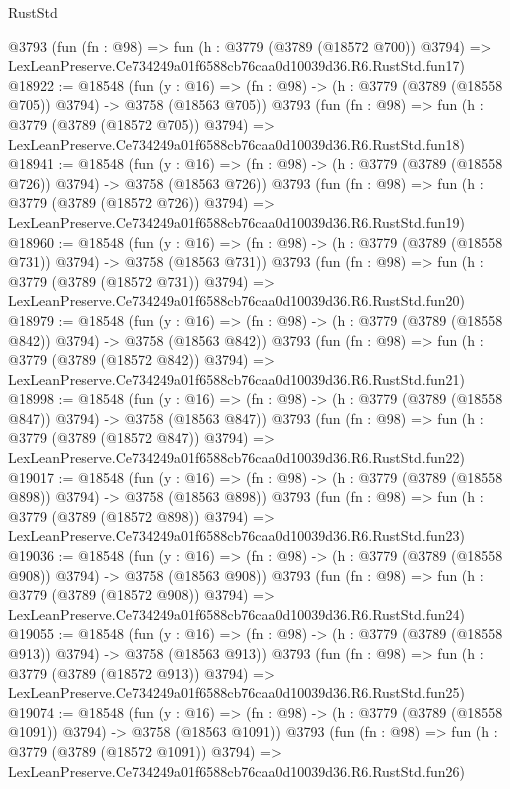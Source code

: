 \begin{lexlean}{RustStd}
\begin{coremodule}
    @3793
    (fun (fn : @98) =>
    fun (h : @3779 (@3789 (@18572 @700)) @3794) =>
    LexLeanPreserve.Ce734249a01f6588cb76caa0d10039d36.R6.RustStd.fun17)
@18922 := @18548
    (fun (y : @16) => (fn : @98) -> (h : @3779 (@3789 (@18558 @705)) @3794) -> @3758 (@18563 @705))
    @3793
    (fun (fn : @98) =>
    fun (h : @3779 (@3789 (@18572 @705)) @3794) =>
    LexLeanPreserve.Ce734249a01f6588cb76caa0d10039d36.R6.RustStd.fun18)
@18941 := @18548
    (fun (y : @16) => (fn : @98) -> (h : @3779 (@3789 (@18558 @726)) @3794) -> @3758 (@18563 @726))
    @3793
    (fun (fn : @98) =>
    fun (h : @3779 (@3789 (@18572 @726)) @3794) =>
    LexLeanPreserve.Ce734249a01f6588cb76caa0d10039d36.R6.RustStd.fun19)
@18960 := @18548
    (fun (y : @16) => (fn : @98) -> (h : @3779 (@3789 (@18558 @731)) @3794) -> @3758 (@18563 @731))
    @3793
    (fun (fn : @98) =>
    fun (h : @3779 (@3789 (@18572 @731)) @3794) =>
    LexLeanPreserve.Ce734249a01f6588cb76caa0d10039d36.R6.RustStd.fun20)
@18979 := @18548
    (fun (y : @16) => (fn : @98) -> (h : @3779 (@3789 (@18558 @842)) @3794) -> @3758 (@18563 @842))
    @3793
    (fun (fn : @98) =>
    fun (h : @3779 (@3789 (@18572 @842)) @3794) =>
    LexLeanPreserve.Ce734249a01f6588cb76caa0d10039d36.R6.RustStd.fun21)
@18998 := @18548
    (fun (y : @16) => (fn : @98) -> (h : @3779 (@3789 (@18558 @847)) @3794) -> @3758 (@18563 @847))
    @3793
    (fun (fn : @98) =>
    fun (h : @3779 (@3789 (@18572 @847)) @3794) =>
    LexLeanPreserve.Ce734249a01f6588cb76caa0d10039d36.R6.RustStd.fun22)
@19017 := @18548
    (fun (y : @16) => (fn : @98) -> (h : @3779 (@3789 (@18558 @898)) @3794) -> @3758 (@18563 @898))
    @3793
    (fun (fn : @98) =>
    fun (h : @3779 (@3789 (@18572 @898)) @3794) =>
    LexLeanPreserve.Ce734249a01f6588cb76caa0d10039d36.R6.RustStd.fun23)
@19036 := @18548
    (fun (y : @16) => (fn : @98) -> (h : @3779 (@3789 (@18558 @908)) @3794) -> @3758 (@18563 @908))
    @3793
    (fun (fn : @98) =>
    fun (h : @3779 (@3789 (@18572 @908)) @3794) =>
    LexLeanPreserve.Ce734249a01f6588cb76caa0d10039d36.R6.RustStd.fun24)
@19055 := @18548
    (fun (y : @16) => (fn : @98) -> (h : @3779 (@3789 (@18558 @913)) @3794) -> @3758 (@18563 @913))
    @3793
    (fun (fn : @98) =>
    fun (h : @3779 (@3789 (@18572 @913)) @3794) =>
    LexLeanPreserve.Ce734249a01f6588cb76caa0d10039d36.R6.RustStd.fun25)
@19074 := @18548
    (fun (y : @16) =>
    (fn : @98) -> (h : @3779 (@3789 (@18558 @1091)) @3794) -> @3758 (@18563 @1091))
    @3793
    (fun (fn : @98) =>
    fun (h : @3779 (@3789 (@18572 @1091)) @3794) =>
    LexLeanPreserve.Ce734249a01f6588cb76caa0d10039d36.R6.RustStd.fun26)

\end{coremodule}
\end{lexlean}
